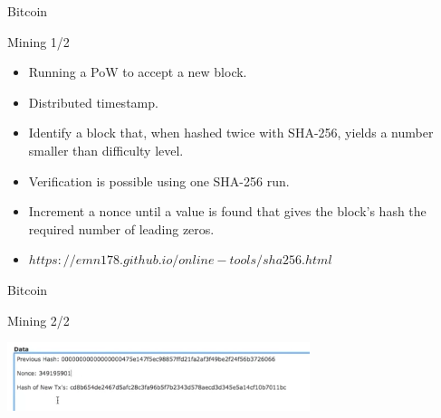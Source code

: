 \begin{frame}{Bitcoin}
  \begin{block}{Mining 1/2}
    \begin{itemize}
      \item Running a PoW to accept a new block.
      \item Distributed timestamp.
      \item Identify a block that, when hashed twice with SHA-256, yields a number smaller than difficulty level.
      \item Verification is possible using one SHA-256 run.
      \item Increment a nonce until a value is found that gives the block's hash the required number of leading zeros.
      \item $https://emn178.github.io/online-tools/sha256.html$
    \end{itemize}
  \end{block}
\end{frame}

\begin{frame}{Bitcoin}
  \begin{block}{Mining 2/2}
    \begin{center}
      \includegraphics[height=2cm]{img/content.png}
    \end{center}
  \end{block}
\end{frame}

